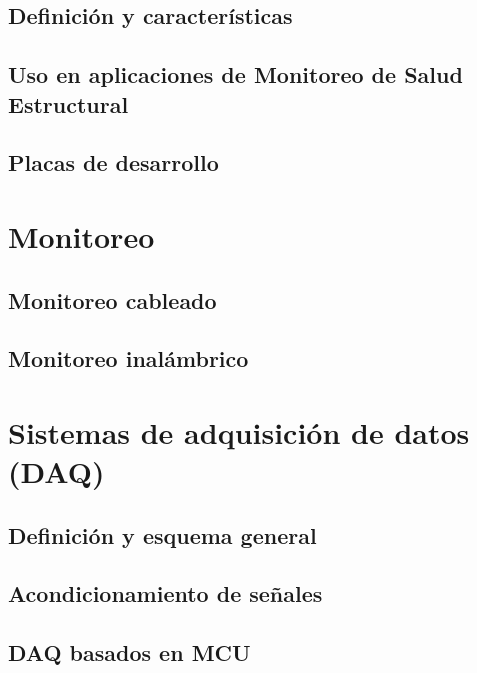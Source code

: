\subsection{Definición y características}

\subsection{Uso en aplicaciones de Monitoreo de Salud Estructural}

\subsection{Placas de desarrollo}



\section{Monitoreo}

\subsection{Monitoreo cableado}

\subsection{Monitoreo inalámbrico}



\section{Sistemas de adquisición de datos (DAQ)}

\subsection{Definición y esquema general}

\subsection{Acondicionamiento de señales}

\subsection{DAQ basados en MCU}